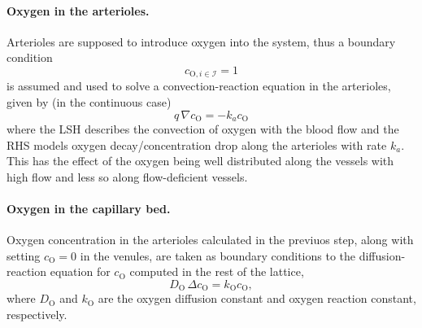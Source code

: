 \documentclass[aps,pra,a4paper,twocolumn,10pt,superscriptaddress,longbibliography]{revtex4-1}
\newcommand{\ox}{\textrm{O}}
\begin{document}
\paragraph{Oxygen in the arterioles.}
Arterioles are supposed to introduce oxygen into the system, thus a boundary condition
\begin{equation}
c_{\ox, i\in\mathcal{I}} = 1
\end{equation}
is assumed and used to solve a convection-reaction equation in the arterioles, given by (in the continuous case)
\begin{equation}
q\, \nabla c_{\ox} = - k_a c_{\ox}
\end{equation}
where the LSH describes the convection of oxygen with the blood flow and the RHS models oxygen decay/concentration drop along the arterioles with rate $k_a$. This has the effect of the oxygen being well distributed along the vessels with high flow and less so along flow-deficient vessels.
%

\paragraph{Oxygen in the capillary bed.}
Oxygen concentration in the arterioles calculated in the previuos step, along with setting $c_\ox = 0$ in the venules, are taken as boundary conditions to the diffusion-reaction equation for $c_{\ox}$ computed in the rest of the lattice,
\begin{equation}
D_{\ox} \, \Delta c_{\ox} = k_{\ox} c_{\ox},
\end{equation}
where $D_{\ox}$ and $k_{\ox}$ are the oxygen diffusion constant and oxygen reaction constant, respectively. 
%
\end{document}
